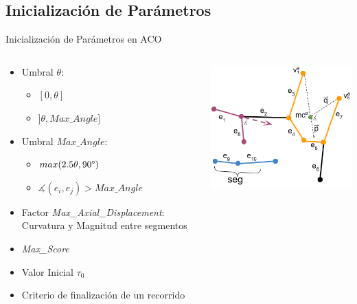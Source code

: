 \subsection{Inicializaci\'on de Par\'ametros}
\begin{frame}{Inicializaci\'on de Par\'ametros en ACO}
    \begin{columns}
        \hspace{-1cm}
        \begin{column}{0.45\textwidth}
            \begin{itemize} \fontsize{9pt}{5}\selectfont
                \item Umbral $\theta$: 
                \begin{itemize} \fontsize{9pt}{5}\selectfont
                    \item $[0, \theta]$
                    \item $]\theta, Max\_Angle]$
                \end{itemize}
                \item Umbral $Max\_Angle$: 
                \begin{itemize} \fontsize{9pt}{5}\selectfont
                    \item $max(2.5 \theta, 90\degree)$
                    \item $\measuredangle (e_{i}, e_{j})> Max\_Angle$
                \end{itemize}
                \item Factor {\it Max\_Axial\_Displacement}: Curvatura y Magnitud entre segmentos
                \item {\it Max\_Score}
                \item Valor Inicial $\tau_0$
                \item Criterio de finalizaci\'on de un recorrido
            \end{itemize}
        \end{column}
        \begin{column}{0.55\textwidth}
            \centering
            \includegraphics[scale=0.55]{Pictures/ant-params.png}
        \end{column}
    \end{columns}
\end{frame}

